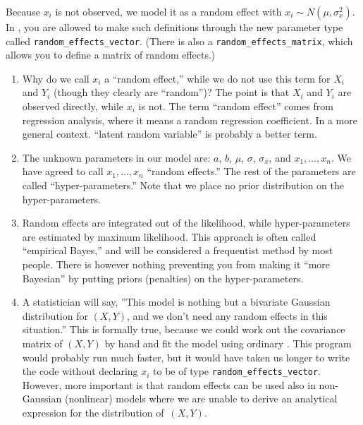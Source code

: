 \documentclass{admbmanual}
\begin{document}
Because $x_i$ is not observed, we model it as a random effect with $x_i\sim
N(\mu ,\sigma_{x}^{2})$. In \scAR, you are allowed to make such definitions
through the new parameter type called \texttt{random\_effects\_vector}.
 (There is also a
\texttt{random\_effects\_matrix}, which allows you to define a matrix of random
effects.) 

\begin{enumerate}
  \item Why do we call $x_i$ a ``random effect,'' while we do not use this term
  for $X_i$ and $Y_i$ (though they clearly are ``random'')? The point is that
  $X_i$ and $Y_i$ are observed directly, while $x_i$ is not. The term ``random
  effect'' comes from regression analysis, where it means a random regression
  coefficient. In a more general context. ``latent random variable'' is probably
  a better term.

  \item The unknown parameters in our model are: $a$, $b$, $\mu $, $\sigma $,
  $\sigma_{x}$, and $x_{1},\ldots ,x_{n}$. We have agreed to call
  $x_{1},\ldots,x_{n}$ ``random effects.'' The rest of the parameters are called
  ``hyper-parameters.'' Note that we place no prior distribution on the
  hyper-parameters.

  \item Random effects are integrated out of the likelihood, while
  hyper-parameters are estimated by maximum likelihood. 
  This approach is often called ``empirical Bayes,'' and will be considered a
  frequentist method by most people. There is however nothing preventing you
  from making it ``more Bayesian'' by putting priors (penalties) on the
  hyper-parameters.

  \item A statistician will say, ''This model is nothing but a bivariate
  Gaussian distribution for $(X,Y)$, and we don't need any random effects in
  this situation.'' This is formally true, because we could work out the
  covariance matrix of $(X,Y)$ by hand and fit the model using ordinary \scAB.
  This program would probably run much faster, but it would have taken us longer
  to write the code without declaring $x_i$ to be of type
  \texttt{random\_effects\_vector}. However, more important is that random
  effects can be used also in non-Gaussian (nonlinear) models where we are
  unable to derive an analytical expression for the distribution of~$(X,Y)$.


\end{enumerate}
\end{document}
